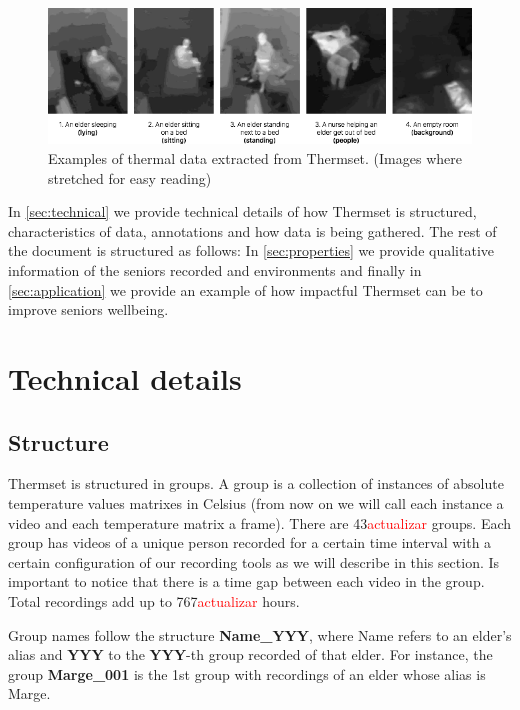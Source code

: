 \documentclass[oneside, twocolumn]{article}
\newcommand\myworries[1]{\textcolor{red}{#1}}
\begin{document}
\begin{figure}
  \centering
    \includegraphics[width=1.0\textwidth]{images/examples}
  \caption{Examples of thermal data extracted from Thermset. (Images where stretched for easy reading)}
  \label{fig:examples}
\end{figure}



In \autoref{sec:technical} we provide technical details of how Thermset is structured, characteristics of data, annotations and how data is being gathered. The rest of the document is structured as follows: In \autoref{sec:properties} we provide qualitative information of the seniors recorded and environments and finally in \autoref{sec:application} we provide an example of how impactful Thermset can be to improve seniors wellbeing.


\section{Technical details}
\label{sec:technical}
\subsection{Structure}
Thermset is structured in groups. A group is a collection of instances of absolute temperature values matrixes in Celsius (from now on we will call each instance a video and each temperature matrix a frame). There are 43\myworries{actualizar} groups. Each group has videos of a unique person recorded for a certain time interval with a certain configuration of our recording tools as we will describe in this section. Is important to notice that there is a time gap between each video in the group. Total recordings add up to 767\myworries{actualizar} hours.

Group names follow the structure \textbf{Name\_YYY}, where Name refers to an elder's alias and \textbf{YYY} to the \textbf{YYY}-th group recorded of that elder. For instance, the group \textbf{Marge\_001} is the 1st group with recordings of an elder whose alias is Marge.
\end{document}
